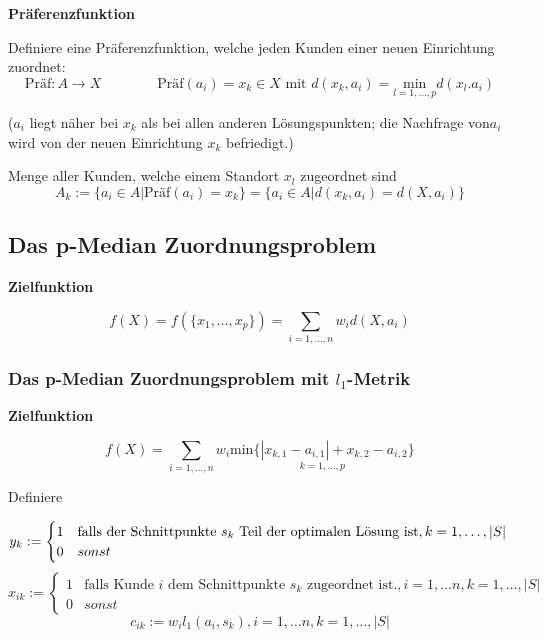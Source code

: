       \par \textbf{Präferenzfunktion}    
      \par Definiere eine Präferenzfunktion, welche jeden Kunden einer neuen Einrichtung zuordnet:
      \[\text{Präf}: A \rightarrow X \qquad \qquad \text{Präf}(a_i) = x_k \in X \text{ mit } d(x_k, a_i) = \underset{l=1, \dots, p}{\text{min}}d(x_l. a_i)\]

      \par ($a_i$ liegt näher bei $x_k$ als bei allen anderen Lösungspunkten; die Nachfrage von$a_i$ wird von der neuen Einrichtung $x_k$ befriedigt.)

      \par Menge aller Kunden, welche einem Standort $x_l$ zugeordnet sind
      \[A_k := \{a_i \in A | \text{Präf}(a_i) = x_k\} = \{a_i \in A | d(x_k, a_i) = d(X, a_i)\}\]

        \subsection{Das p-Median Zuordnungsproblem} %
        \label{sub:das_p_median_zuordnungsproblem}

          \par \textbf{Zielfunktion}

          \begin{equation}
            f(X) = f(\{x_1, \dots, x_p\}) = \sum_{i=1,\dots,n}w_id(X, a_i)
          \end{equation}
          \subsubsection{Das p-Median Zuordnungsproblem mit $l_1$-Metrik} %
          \label{ssub:das_p_median_zuordnungsproblem_mit_l1_metrik}
            
            \par \textbf{Zielfunktion}

            \[f(X) = \sum_{i = 1, \dots, n}w_i \underset{k = 1, \dots, p}{\text{min}\{|x_{k,1} - a_{i,1}| + {x_{k,2} - a_{i,2}}\}}\]

            \par Definiere

            \[
              y_k := 
              \begin{cases}
                1 & \text{falls der Schnittpunkte } s_k \text{ Teil der optimalen Lösung ist}, k = 1, \dots, |S|\\
                0 & sonst 
              \end{cases}\\ 
            \]
            \[
               x_{ik} := 
              \begin{cases}
                1 & \text{falls Kunde } i \text{ dem Schnittpunkte } s_k \text{ zugeordnet ist.}, i = 1, \dots n, k = 1, \dots, |S| \\
                0 & sonst
               \end{cases} 
            \]
            \[
              c_{ik} := w_il_1(a_i, s_k), i = 1, \dots n, k = 1, \dots, |S|
            \]

